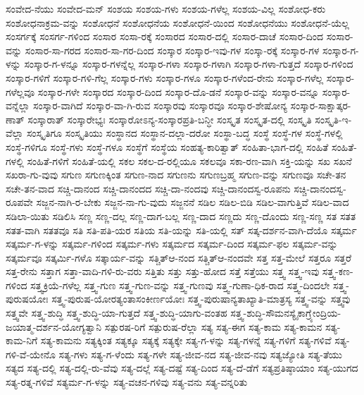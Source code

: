 {ಸಂವೇದ-ನೆಯು
ಸಂವೇದ-ಮನ್
ಸಂಶಯ
ಸಂಶಯ-ಗಳು
ಸಂಶಯ-ಗಳೆಲ್ಲ
ಸಂಶಯ-ವಿಲ್ಲ
ಸಂಶೋಧ-ಕರು
ಸಂಶೋಧನಾಕ್ರಮ-ವನ್ನು
ಸಂಶೋಧನೆ
ಸಂಶೋಧನೆಯ
ಸಂಶೋಧನೆ-ಯಿಂದ
ಸಂಶೋಧನೆಯು
ಸಂಶೋಧನೆ-ಯೆಲ್ಲ
ಸಂಸರ್ಗಕ್ಕೆ
ಸಂಸರ್ಗ-ಗಳಿಂದ
ಸಂಸಾರ
ಸಂಸಾ-ರಕ್ಕೆ
ಸಂಸಾರದ
ಸಂಸಾರ-ದಲ್ಲಿ
ಸಂಸಾರ-ದಾಚೆ
ಸಂಸಾರ-ದಿಂದ
ಸಂಸಾರ-ವನ್ನು
ಸಂಸಾರ-ಸಾ-ಗರದ
ಸಂಸಾರ-ಸಾ-ಗರ-ದಿಂದ
ಸಂಸ್ಕಾರ
ಸಂಸ್ಕಾರ-ಇವು-ಗಳ
ಸಂಸ್ಕಾ-ರಕ್ಕೆ
ಸಂಸ್ಕಾರ-ಗಳ
ಸಂಸ್ಕಾರ-ಗ-ಳನ್ನು
ಸಂಸ್ಕಾರ-ಗ-ಳನ್ನೂ
ಸಂಸ್ಕಾರ-ಗಳನ್ನೆಲ್ಲ
ಸಂಸ್ಕಾರ-ಗಳಾ
ಸಂಸ್ಕಾರ-ಗಳಾಗಿ
ಸಂಸ್ಕಾರ-ಗಳಾ-ಗುತ್ತದೆ
ಸಂಸ್ಕಾರ-ಗಳಿಂದ
ಸಂಸ್ಕಾರ-ಗಳಿಗೆ
ಸಂಸ್ಕಾರ-ಗಳಿ-ಗೆಲ್ಲ
ಸಂಸ್ಕಾರ-ಗಳು
ಸಂಸ್ಕಾರ-ಗಳೂ
ಸಂಸ್ಕಾರ-ಗಳೆಂದ-ರೇನು
ಸಂಸ್ಕಾರ-ಗಳೆಲ್ಲ
ಸಂಸ್ಕಾರ-ಗಳೆಲ್ಲವೂ
ಸಂಸ್ಕಾರ-ಗಳೇ
ಸಂಸ್ಕಾರದ
ಸಂಸ್ಕಾರ-ದಿಂದ
ಸಂಸ್ಕಾರ-ದೊ-ಡನೆ
ಸಂಸ್ಕಾರ-ವನ್ನು
ಸಂಸ್ಕಾರ-ವನ್ನೂ
ಸಂಸ್ಕಾರ-ವನ್ನೆಲ್ಲಾ
ಸಂಸ್ಕಾರ-ವಾಗಿದೆ
ಸಂಸ್ಕಾರ-ವಾ-ಗಿ-ರುವ
ಸಂಸ್ಕಾರವು
ಸಂಸ್ಕಾರವೂ
ಸಂಸ್ಕಾರ-ಶೇಷೋನ್ಯ
ಸಂಸ್ಕಾರ-ಸಾಕ್ಷಾತ್ಕರ-ಣಾತ್
ಸಂಸ್ಕಾರಾತ್
ಸಂಸ್ಕಾರೇಭ್ಯಃ
ಸಂಸ್ಕಾರೋಽನ್ಯ-ಸಂಸ್ಕಾರಪ್ರತಿ-ಬನ್ಧೀ
ಸಂಸ್ಕೃತ
ಸಂಸ್ಕೃತ-ದಲ್ಲಿ
ಸಂಸ್ಕೃತಿ
ಸಂಸ್ಕೃತಿ-ಇ-ವೆಲ್ಲಾ
ಸಂಸ್ಕೃತಿಗೂ
ಸಂಸ್ಕೃತಿಯು
ಸಂಸ್ಥಾನದ
ಸಂಸ್ಥಾನ-ದಲ್ಲಾ-ದರೋ
ಸಂಸ್ಥಾ-ಬದ್ಧ
ಸಂಸ್ಥೆ
ಸಂಸ್ಥೆ-ಗಳ
ಸಂಸ್ಥೆ-ಗಳಲ್ಲಿ
ಸಂಸ್ಥೆ-ಗಳಿಗೂ
ಸಂಸ್ಥೆ-ಗಳು
ಸಂಸ್ಥೆ-ಗಳೂ
ಸಂಸ್ಥೆಗೆ
ಸಂಸ್ಥೆಯ
ಸಂಹತ್ಯ-ಕಾರಿತ್ವಾತ್
ಸಂಹಿತಾ-ಭಾಗ-ದಲ್ಲಿ
ಸಂಹಿತೆ
ಸಂಹಿತೆ-ಗಳಲ್ಲಿ
ಸಂಹಿತೆ-ಗಳಿಗೆ
ಸಂಹಿತೆ-ಯಲ್ಲಿ
ಸಕಲ
ಸಕಲ-ದ-ರಲ್ಲಿಯೂ
ಸಕಲವೂ
ಸಕಾ-ರಣ-ವಾಗಿ
ಸಕ್ತಿ-ಯನ್ನು
ಸಖ
ಸಖನೆ
ಸಖರಾ-ಗು-ವುವು
ಸಗುಣ
ಸಗುಣಕ್ಕಿಂತ
ಸಗುಣ-ನಾದ
ಸಗುಣನು
ಸಗುಣಬ್ರಹ್ಮ
ಸಗುಣ-ವನ್ನು
ಸಗುಣವೂ
ಸಚೇ-ತನ
ಸಚೇ-ತನ-ವಾದ
ಸಚ್ಚಿ-ದಾನಂದ
ಸಚ್ಚಿ-ದಾನಂದದ
ಸಚ್ಚಿ-ದಾ-ನಂದವು
ಸಚ್ಚಿ-ದಾನಂದಸ್ವ-ರೂಪನು
ಸಚ್ಚಿ-ದಾನಂದಸ್ವ-ರೂಪವೇ
ಸಜ್ಜನ-ನಾಗಿ-ರ-ಬೇಕು
ಸಜ್ಜನ-ನಾ-ಗು-ವುದು
ಸಜ್ಜನನೆ
ಸಡಿಲ
ಸಡಿಲ-ಬಿಡಿ
ಸಡಿಲ-ವಾಗುತ್ತಿವೆ
ಸಡಿಲ-ವಾದ
ಸಡಿಲಾ-ಯಿತು
ಸಡಿಲಿಸಿ
ಸಣ್ಣ
ಸಣ್ಣ-ದಲ್ಲ
ಸಣ್ಣ-ದಾಗ-ಬಲ್ಲ
ಸಣ್ಣ-ದಾದ
ಸಣ್ಣದು
ಸಣ್ಣ-ದೊಂದು
ಸಣ್ಣ-ಸಣ್ಣ
ಸತ
ಸತತ
ಸತತ-ವಾಗಿ
ಸತತವೂ
ಸತಿ
ಸತಿ-ಪತಿ-ಯರ
ಸತಿಯ
ಸತಿ-ಯನ್ನು
ಸತಿ-ಯಲ್ಲಿ
ಸತ್
ಸತ್ಕ-ದರ್ಶನ-ವಾಗಿ-ದೆಯೊ
ಸತ್ಕರ್ಮ
ಸತ್ಕರ್ಮ-ಗ-ಳನ್ನು
ಸತ್ಕರ್ಮ-ಗಳಿಂದ
ಸತ್ಕರ್ಮ-ಗಳು
ಸತ್ಕರ್ಮದ
ಸತ್ಕರ್ಮ-ದಿಂದ
ಸತ್ಕರ್ಮ-ಫಲ
ಸತ್ಕರ್ಮ-ವನ್ನು
ಸತ್ಕರ್ಮವೂ
ಸತ್ಕರ್ಮಿ-ಗಳೊ
ಸತ್ಕಾರ್ಯ-ವನ್ನು
ಸತ್ಚಿತ್ಆ-ನಂದ
ಸತ್ಚಿತ್ಆ-ನಂದವೇ
ಸತ್ತ
ಸತ್ತ-ಮೇಲೆ
ಸತ್ತರೂ
ಸತ್ತರೆ
ಸತ್ತ-ರೇನು
ಸತ್ತಾಗ
ಸತ್ತಾ-ವಾದಿ-ಗಳಿ-ರು-ವರು
ಸತ್ತಿತು
ಸತ್ತು
ಸತ್ತು-ಹೋದ
ಸತ್ತೆ
ಸತ್ತೆಯು
ಸತ್ತ್ವ
ಸತ್ತ್ವ-ಇವು
ಸತ್ತ್ವ-ಕಣ-ಗಳಿಂದ
ಸತ್ತ್ವಕ್ರಿಯೆ-ಗಳೆಲ್ಲ
ಸತ್ತ್ವ-ಗುಣ
ಸತ್ತ್ವ-ಗುಣ-ವನ್ನು
ಸತ್ತ್ವ-ಗುಣವು
ಸತ್ತ್ವ-ಗುಣಾ-ಧಿಕ-ರಾದ
ಸತ್ತ್ವ-ದಿಂದಲೇ
ಸತ್ತ್ವ-ಪುರುಷಯೋಃ
ಸತ್ತ್ವ-ಪುರುಷ-ಯೋರತ್ಯಂತಾಸಂಕೀರ್ಣಯೋಃ
ಸತ್ತ್ವ-ಪುರುಷಾನ್ಯತಾಖ್ಯಾತಿ-ಮಾತ್ರಸ್ಯ
ಸತ್ತ್ವ-ವನ್ನು
ಸತ್ತ್ವವು
ಸತ್ತ್ವವೇ
ಸತ್ತ್ವ-ಶುದ್ಧಿ
ಸತ್ತ್ವ-ಶುದ್ಧಿ-ಯಾ-ಗುತ್ತದೆ
ಸತ್ತ್ವ-ಶುದ್ಧಿ-ಯಾಗು-ವಂತಹ
ಸತ್ತ್ವ-ಶುದ್ಧಿ-ಸೌಮನಸ್ಯೈಕಾಗ್ರ್ಯೇಂದ್ರಿಯ-ಜಯಾತ್ಮ-ದರ್ಶನ-ಯೋಗ್ಯತ್ವಾನಿ
ಸತ್ಪುರಷ-ರಿಗೆ
ಸತ್ಪುರುಷ-ರೆಲ್ಲಾ
ಸತ್ಯ
ಸತ್ಯ-ಈಗ
ಸತ್ಯ-ಕಾಮ
ಸತ್ಯ-ಕಾಮನ
ಸತ್ಯ-ಕಾಮ-ನಿಗೆ
ಸತ್ಯ-ಕಾಮನು
ಸತ್ಯಕ್ಕಿಂತ
ಸತ್ಯಕ್ಕೂ
ಸತ್ಯಕ್ಕೆ
ಸತ್ಯಕ್ಕೇ
ಸತ್ಯ-ಗ-ಳನ್ನು
ಸತ್ಯ-ಗಳನ್ನೆ
ಸತ್ಯ-ಗಳಿಗೆ
ಸತ್ಯ-ಗಳಿವೆ
ಸತ್ಯ-ಗಳಿ-ವೆ-ಯೇನೊ
ಸತ್ಯ-ಗಳು
ಸತ್ಯ-ಗ-ಳೆಂದು
ಸತ್ಯ-ಗಳೇ
ಸತ್ಯ-ಜೀವ-ನದ
ಸತ್ಯ-ಜೀವ-ನವು
ಸತ್ಯಜ್ಯೋತಿ
ಸತ್ಯ-ತೆಯು
ಸತ್ಯದ
ಸತ್ಯ-ದಲ್ಲಿ
ಸತ್ಯ-ದಲ್ಲಿ-ರು-ವೆವು
ಸತ್ಯ-ದಲ್ಲೆ
ಸತ್ಯ-ದಷ್ಟೆ
ಸತ್ಯ-ದಿಂದ
ಸತ್ಯ-ದೆ-ಡೆಗೆ
ಸತ್ಯಪ್ರತಿಷ್ಠಾಯಾಂ
ಸತ್ಯ-ಯುಗದ
ಸತ್ಯ-ರತ್ನ-ಗಳಿವೆ
ಸತ್ಯರ್ಮ-ಗ-ಳನ್ನು
ಸತ್ಯ-ವಚನ-ಗಳಿವು
ಸತ್ಯ-ವನು
ಸತ್ಯ-ವನ್ನರಿತು
}
